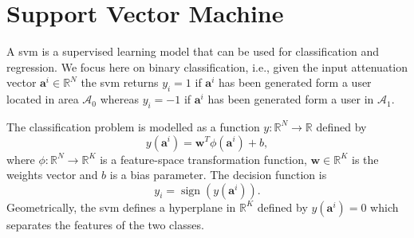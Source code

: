 \documentclass[draftcls,onecolumn,12pt]{IEEEtran}
\newcommand{\ie}{i.e., }
\DeclareMathOperator{\sign}{sign}
\begin{document}
\section{Support Vector Machine}\label{sec:svm}
A \ac{svm} \cite{Bishop2006} is a supervised learning model that can be used for classification and regression. We focus here on binary classification, \ie given the input attenuation vector $\mathbf{a}^i \in \mathbb{R}^N$ the \ac{svm} returns $y_i = 1$ if $\mathbf{a}^i$ has been generated form a user located in area $\mathcal{A}_0$ whereas $y_i=-1$ if $\mathbf{a}^i$ has been generated form a user in $\mathcal{A}_1$.

The classification problem is modelled as a function $y: \mathbb{R}^N \to \mathbb{R}$ defined by
\begin{equation}
\label{eq:svm}
	y(\mathbf{a}^i) = \mathbf{w}^T \phi (\mathbf{a}^i) + b,
\end{equation}
where $\phi: \mathbb{R}^N \to \mathbb{R}^K$ is a feature-space transformation function, $\mathbf{w} \in \mathbb{R}^K$ is the weights vector and $b$ is a bias parameter. The decision function is 
\begin{equation}
\label{eq:sign}
	y_i = \sign(y(\mathbf{a}^i)).
\end{equation}
Geometrically, the \ac{svm} defines a hyperplane in $\mathbb{R}^K$ defined by $y(\mathbf{a}^i)=0$ which separates the features of the two classes.
\end{document}
